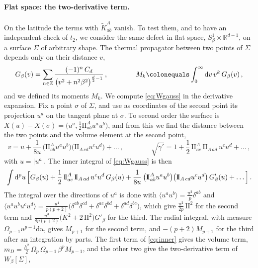\documentclass[a4paper,11pt]{article}
\newcommand{\II}{\mathrm{I\!I}}
\newcommand{\Kt}{\widetilde{K}}
\newcommand{\dd}{\mathrm{d}}
\begin{document}
	\paragraph{Flat space: the two-derivative term.}
	On the latitude the terms with $\Kt^A_{ab}$ vanish. To test them, and to have an independent check of $t_2$, we consider the same defect in flat space, $S^1_\beta\times\mathbb{R}^{d-1}$, on a surface $\Sigma$ of arbitrary shape. The thermal propagator between two points of $\Sigma$ depends only on their distance $v$,
	\begin{equation}
		G_\beta(v)=\sum_{n\in\mathbb{Z}}\frac{(-1)^n\,C_d}{\bigl(v^2+n^2\beta^2\bigr)^{\frac d2-1}}\, ,\qquad\qquad M_k\colonequals\int_0^\infty\dd v\,v^k\,G_\beta(v)\, ,
	\end{equation}
	and we defined its moments $M_k$. We compute \eqref{eq:Wgauss} in the derivative expansion. Fix a point $\sigma$ of $\Sigma$, and use as coordinates of the second point its projection $u^a$ on the tangent plane at $\sigma$. To second order the surface is $X(u)-X(\sigma)=\bigl(u^a,\tfrac12\II^A_{ab}u^au^b\bigr)$, and from this we find the distance between the two points and the volume element at the second point,
	\begin{equation}
		v=u+\frac{1}{8u}\,\bigl(\II^A_{ab}u^au^b\bigr)\bigl(\II_{A\,cd}u^cu^d\bigr)+\dots\, ,\qquad\qquad
		\sqrt{\gamma'}=1+\frac12\,\II^A_{ac}\,\II_{A\,ad}\,u^cu^d+\dots\, ,
	\end{equation}
	with $u=|u^a|$. The inner integral of \eqref{eq:Wgauss} is then
	\begin{equation}\label{eq:inner}
		\int\dd^pu\,\Bigl[G_\beta(u)+\frac12\,\II^A_{ac}\,\II_{A\,ad}\,u^cu^d\,G_\beta(u)+\frac{1}{8u}\,\bigl(\II^A_{ab}u^au^b\bigr)\bigl(\II_{A\,cd}u^cu^d\bigr)\,G'_\beta(u)+\dots\Bigr]\, .
	\end{equation}
	The integral over the directions of $u^a$ is done with $\langle u^au^b\rangle=\tfrac{u^2}{p}\delta^{ab}$ and $\langle u^au^bu^cu^d\rangle=\tfrac{u^4}{p(p+2)}\bigl(\delta^{ab}\delta^{cd}+\delta^{ac}\delta^{bd}+\delta^{ad}\delta^{bc}\bigr)$, which give $\tfrac{u^2}{2p}\,\II^2$ for the second term and $\tfrac{u^3}{8p(p+2)}\bigl(K^2+2\,\II^2\bigr)G'_\beta$ for the third. The radial integral, with measure $\Omega_{p-1}u^{p-1}\dd u$, gives $M_{p+1}$ for the second term, and $-(p+2)M_{p+1}$ for the third after an integration by parts. The first term of \eqref{eq:inner} gives the volume term, $m_D=\tfrac{h^2}{2}\,\Omega_p\,\Omega_{p-1}\,\beta^pM_{p-1}$, and the other two give the two-derivative term of $W_\beta[\Sigma]$,
\end{document}
